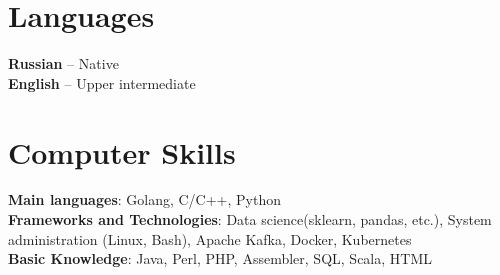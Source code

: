 \documentclass[margin,line,a4paper]{resume}
\begin{document}
\begin{resume}
\section{\mysidestyle Languages}
    \textbf{Russian} – Native \\
    \textbf{English} – Upper intermediate \\

\section{\mysidestyle Computer Skills}
    \textbf{Main languages}: Golang, C/C++, Python\\
    \textbf{Frameworks and Technologies}: Data science(sklearn, pandas, etc.),  System administration (Linux, Bash), Apache Kafka, Docker, Kubernetes\\
    \textbf{Basic Knowledge}: Java, Perl, PHP, Assembler, SQL, Scala, HTML\\
    

\end{resume}
\end{document}
